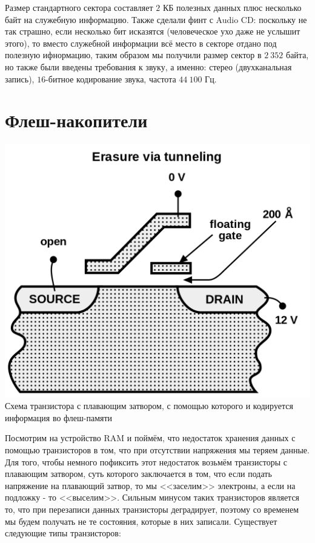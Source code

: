 \documentclass[12pt, a4paper]{article}
\begin{document}
Размер стандартного сектора составляет $2$ КБ полезных данных плюс несколько байт на служебную информацию. Также сделали финт с Audio CD: поскольку не так страшно, если несколько бит исказятся (человеческое ухо даже не услышит этого), то вместо служебной информации всё место в секторе отдано под полезную ифнормацию, таким образом мы получили размер сектор в $2 \ 352$ байта, но также были введены требования к звуку, а именно: стерео (двухканальная запись), $16$-битное кодирование звука, частота $44 \ 100$ Гц.

\section{Флеш-накопители}

\begin{center}
{\includegraphics[scale=0.3]{./images/Flash_erase.png} \\ Схема транзистора с плавающим затвором, с помощью которого и кодируется информация во флеш-памяти}
\end{center}


Посмотрим на устройство RAM и поймём, что недостаток хранения данных с помощью транзисторов в том, что при отсутствии напряжения мы теряем данные. Для того, чтобы немного пофиксить этот недостаток возьмём транзисторы с плавающим затвором, суть которого заключается в том, что если подать напряжение на плавающий затвор, то мы <<заселим>> электроны, а если на подложку - то <<выселим>>. Сильным минусом таких транзисторов является то, что при перезаписи данных транзисторы деградирует, поэтому со временем мы будем получать не те состояния, которые в них записали. Существует следующие типы транзисторов:
\end{document}
